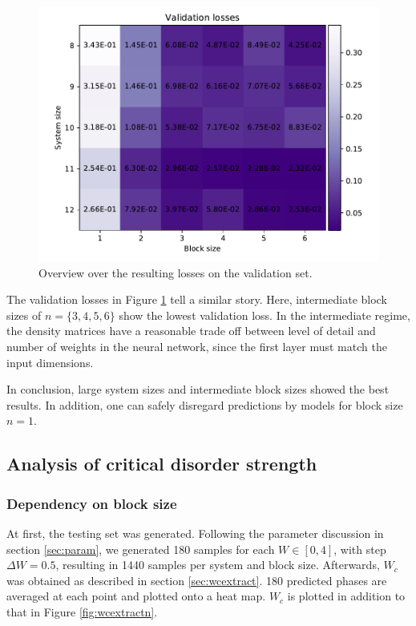 \documentclass[reprint,amsmath,amssymb,aps,prb]{revtex4-2}
\begin{document}
\begin{figure}
	\centering
	\includegraphics[width=\linewidth]{../results/accuracy_loss_epochs/all_validation_losses}
	\caption{Overview over the resulting losses on the validation set.}
	\label{fig:all_validation_accuracy}
\end{figure}

The validation losses in Figure \ref{fig:all_validation_accuracy} tell a similar story. Here, intermediate block sizes of $n=\{3, 4, 5, 6\}$ show the lowest validation loss. In the intermediate regime, the density matrices have a reasonable trade off between level of detail and number of weights in the neural network, since the first layer must match the input dimensions.

In conclusion, large system sizes and intermediate block sizes showed the best results. In addition, one can safely disregard predictions by models for block size $n=1$.

\subsection{Analysis of critical disorder strength}
\subsubsection{Dependency on block size}
At first, the testing set was generated. Following the parameter discussion in section \ref{sec:param}, we generated 180 samples for each $W\in\left[0,4\right]$, with step $\Delta W=0.5$, resulting in 1440 samples per system and block size. Afterwards, $W_c$ was obtained as described in section \ref{sec:wcextract}.
180 predicted phases are averaged at each point and plotted onto a heat map. $W_c$ is plotted in addition to that in Figure \ref{fig:wcextractn}.
\end{document}
